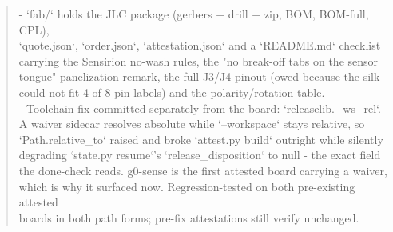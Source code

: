 \documentclass[11pt,a4paper]{article}
\begin{document}
\begin{quote}
- `fab/` holds the JLC package (gerbers + drill + zip, BOM, BOM-full, CPL),\\
  `quote.json`, `order.json`, `attestation.json` and a `README.md` checklist\\
  carrying the Sensirion no-wash rules, the "no break-off tabs on the sensor\\
  tongue" panelization remark, the full J3/J4 pinout (owed because the silk\\
  could not fit 4 of 8 pin labels) and the polarity/rotation table.\\
- Toolchain fix committed separately from the board: `releaselib.\_ws\_rel`.\\
  A waiver sidecar resolves absolute while `--workspace` stays relative, so\\
  `Path.relative\_to` raised and broke `attest.py build` outright while silently\\
  degrading `state.py resume`'s `release\_disposition` to null - the exact field\\
  the done-check reads. g0-sense is the first attested board carrying a waiver,\\
  which is why it surfaced now. Regression-tested on both pre-existing attested\\
  boards in both path forms; pre-fix attestations still verify unchanged.
\end{quote}
\end{document}
